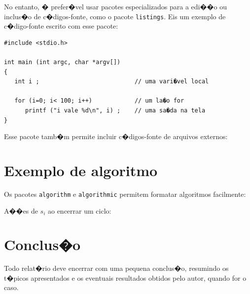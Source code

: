 \documentclass [12pt,oneside] {article}
\begin{document}
No entanto, � prefer�vel usar pacotes especializados para a edi��o ou inclus�o de c�digos-fonte, como o pacote \texttt{listings}. Eis um exemplo de c�digo-fonte escrito com esse pacote:

\begin{lstlisting}
#include <stdio.h>

int main (int argc, char *argv[])
{
   int i ;                           // uma vari�vel local

   for (i=0; i< 100; i++)            // um la�o for
      printf ("i vale %d\n", i) ;    // uma sa�da na tela
}
\end{lstlisting}

Esse pacote tamb�m permite incluir c�digos-fonte de arquivos externos:




\section{Exemplo de algoritmo}

Os pacotes \texttt{algorithm} e \texttt{algorithmic} permitem formatar algoritmos facilmente:

\begin{algorithm}[H]
\caption{A��es de $s_i$ ao encerrar um ciclo:}
\label{on-period-ending}
\begin{small}
\begin{algorithmic}[1]
  \ENDIF
\ENDFOR
\end{algorithmic}
\end{small}
\end{algorithm}


\section{Conclus�o}

Todo relat�rio deve encerrar com uma pequena conclus�o, resumindo os t�picos apresentados e os eventuais resultados obtidos pelo autor, quando for o caso.




\end{document}
